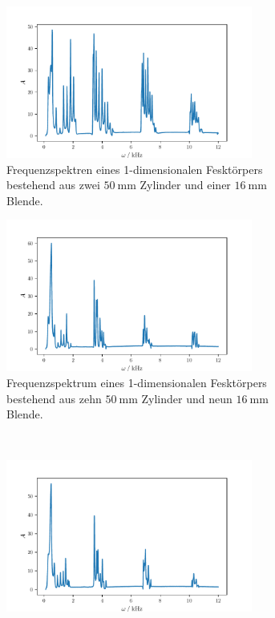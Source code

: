 \begin{figure}
    \begin{subfigure}{0.48\textwidth}%
        \centering%
        \includegraphics[height=5cm]{build/10c9b.pdf}%
        \caption{Frequenzspektren eines 1-dimensionalen Fesktörpers bestehend aus zwei $\qty{50}{\milli\meter}$ Zylinder und einer $\qty{16}{\milli\meter}$ Blende.}%
        \label{fig:10c9b}%
    \end{subfigure}%
    \hfill%
    \begin{subfigure}{0.48\textwidth}%
        \centering%
        \includegraphics[height=5cm]{build/10c9b375.pdf}
        \caption{Frequenzspektrum eines 1-dimensionalen Fesktörpers bestehend aus zehn $\qty{50}{\milli\meter}$ Zylinder und neun $\qty{16}{\milli\meter}$ Blende.}%
        \label{fig:10c9b375}
    \end{subfigure} \\
    \begin{subfigure}{0.48\textwidth}%
        \centering%
        \includegraphics[height=5cm]{build/10c9b625.pdf}%

\end{subfigure}
\end{figure}
